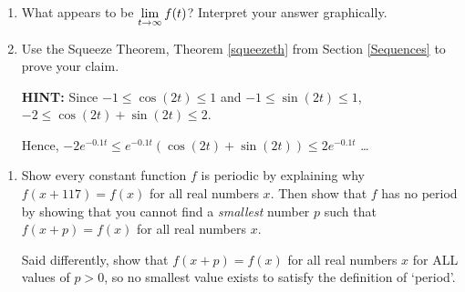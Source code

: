 \begin{enumerate}
\begin{enumerate}

\item What appears to be $\displaystyle{\lim_{t \rightarrow \infty} f(t)}$?   Interpret your answer graphically.

\smallskip

\item  Use the Squeeze Theorem, Theorem \ref{squeezeth} from Section \ref{Sequences} to prove your claim.  

\smallskip

\textbf{HINT:}  Since $-1 \leq \cos(2t) \leq 1$ and $-1 \leq \sin(2t) \leq 1$, $-2 \leq \cos(2t) + \sin(2t) \leq 2$.  

\smallskip

Hence, $-2 e^{-0.1t} \leq e^{-0.1t} \left( \cos(2t) + \sin(2t)\right) \leq 2e^{-0.1t}$ \ldots

\end{enumerate}

\smallskip


\setcounter{HW}{\value{enumi}}

\end{enumerate}

\begin{enumerate}

\setcounter{enumi}{\value{HW}}

\item Show every constant function $f$ is periodic by explaining why $f(x + 117) = f(x)$ for all real numbers $x$. Then show that $f$ has no period by showing that you cannot find a \emph{smallest} number $p$ such that $f(x + p) = f(x)$ for all real numbers $x$.  

\smallskip

Said differently, show that $f(x + p) = f(x)$ for all real numbers $x$ for ALL values of $p > 0$, so no smallest value exists to satisfy the definition of `period'.

\setcounter{HW}{\value{enumi}}

\end{enumerate}

